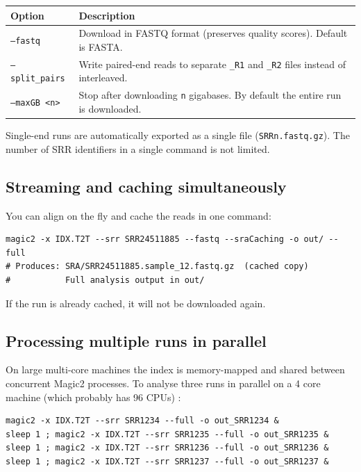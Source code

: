 \documentclass[11pt]{article}
\newcommand{\code}[1]{\texttt{#1}}
\begin{document}
\begin{center}
\begin{tabular}{lp{9cm}}
\toprule
\textbf{Option} & \textbf{Description} \\
\midrule
\code{--fastq}       & Download in FASTQ format (preserves quality scores).
                        Default is FASTA. \\
\code{--split\_pairs} & Write paired-end reads to separate \code{\_R1} and
                        \code{\_R2} files instead of interleaved. \\
\code{--maxGB <n>}   & Stop after downloading \code{n} gigabases.
                        By default the entire run is downloaded. \\
\bottomrule
\end{tabular}
\end{center}

Single-end runs are automatically exported as a single file
(\code{SRRn.fastq.gz}).  The number of SRR identifiers in a single
command is not limited.

\subsection{Streaming and caching simultaneously}

You can align on the fly and cache the reads in one command:
\begin{lstlisting}
magic2 -x IDX.T2T --srr SRR24511885 --fastq --sraCaching -o out/ --full
# Produces: SRA/SRR24511885.sample_12.fastq.gz  (cached copy)
#           Full analysis output in out/
\end{lstlisting}

If the run is already cached, it will not be downloaded again.

\subsection{Processing multiple runs in parallel}

On large multi-core machines the index is memory-mapped and shared between
concurrent Magic2 processes.  To analyse three runs in parallel on a 4 core machine
(which probably has 96 CPUs) :
\begin{lstlisting}
magic2 -x IDX.T2T --srr SRR1234 --full -o out_SRR1234 &
sleep 1 ; magic2 -x IDX.T2T --srr SRR1235 --full -o out_SRR1235 &
sleep 1 ; magic2 -x IDX.T2T --srr SRR1236 --full -o out_SRR1236 &
sleep 1 ; magic2 -x IDX.T2T --srr SRR1237 --full -o out_SRR1237 &
\end{lstlisting}
\end{document}
